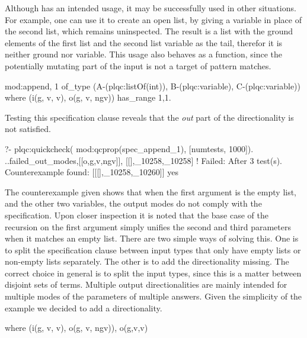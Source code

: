 Although  has an intended usage, it may be successfully
used in other situations.
%
For example, one can use it to create an open list, by giving a variable
in place of the second list, which remains uninspected.
%
The result is a list with the ground elements of the first list and the
second list variable as the tail, therefor it is neither ground nor
variable.
%
This usage also behaves as a function, since the potentially mutating
part of the input is not a target of pattern matches.
%
\begin{yapcode}
 {mod:append, 1}
   of_type (A-(plqc:listOf(int)),
     B-(plqc:variable), C-(plqc:variable))
   where (i(g, v, v), o(g, v, ngv))
   has_range {1,1}.
\end{yapcode}
%
Testing this specification clause reveals that the \emph{out} part of
the directionality is not satisfied.
%
\begin{yapcode}
   ?- plqc:quickcheck(
        mod:qcprop(spec_append_1),
        [{numtests, 1000}]).
 ..{failed_out_modes,[[o,g,v,ngv]],
                     [[],_10258,_10258]}
 !
 Failed: After 3 test(s).
 Counterexample found: [[[],_10258,_10260]] 
 yes
\end{yapcode}
%
The counterexample given shows that when the first argument is the empty
list, and the other two variables, the output modes do not comply with
the specification.
%
Upon closer inspection it is noted that the base case of the recursion
on the first argument simply unifies the second and third parameters
when it matches an empty list.
%
There are two simple ways of solving this.
%
One is to split the specification clause between input types that only
have empty lists or non-empty lists separately.
%
The other is to add the directionality missing.
%
The correct choice in general is to split the input types, since this is
a matter between disjoint sets of terms.
%
Multiple output directionalities are mainly intended for multiple modes
of the parameters of multiple answers.
%
Given the simplicity of the example we decided to add a directionality.
%
\begin{yapcode}
   where (i(g, v, v), o(g, v, ngv)), o(g,v,v)
\end{yapcode}



